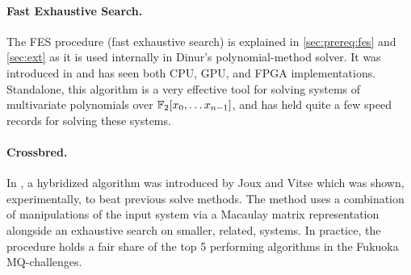 \paragraph{Fast Exhaustive Search.} The FES procedure (fast exhaustive search) is explained in \cref{sec:prereq:fes} and \cref{sec:ext} as it is used internally in Dinur's polynomial-method solver. It was introduced in \cite{ches-2010-23990} and has seen both CPU, GPU, and FPGA implementations. Standalone, this algorithm is a very effective tool for solving systems of multivariate polynomials over $\mathbb{F}_2[x_0,\dots x_{n - 1}]$, and has held quite a few speed records for solving these systems.

\paragraph{Crossbred.} In \cite{cryptoeprint:2017/372}, a hybridized algorithm was introduced by Joux and Vitse which was shown, experimentally, to beat previous solve methods. The method uses a combination of manipulations of the input system via a Macaulay matrix representation alongside an exhaustive search on smaller, related, systems. In practice, the procedure holds a fair share of the top 5 performing algorithms in the Fukuoka MQ-challenges.


\newpage